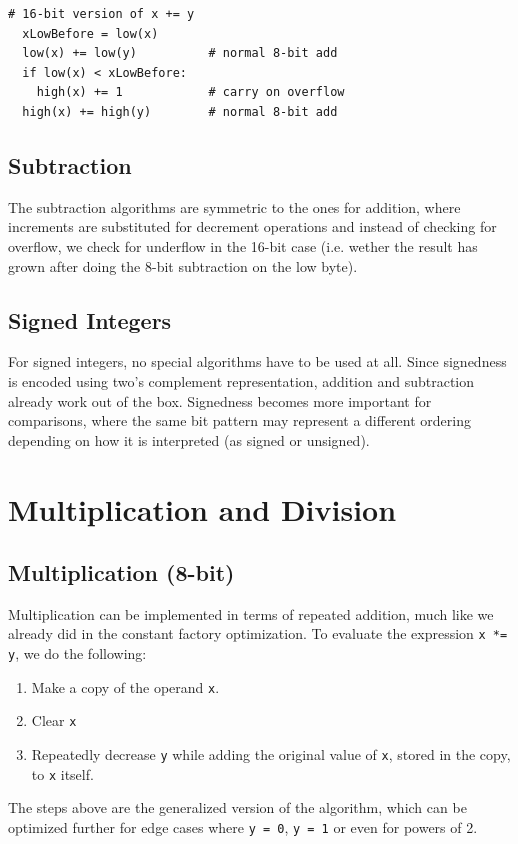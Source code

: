 \vspace{0.5cm}\noindent\begin{minipage}{\linewidth}
\begin{lstlisting}[style=pseudocode]
  # 16-bit version of x += y
  xLowBefore = low(x)
  low(x) += low(y)          # normal 8-bit add
  if low(x) < xLowBefore:
    high(x) += 1            # carry on overflow
  high(x) += high(y)        # normal 8-bit add
\end{lstlisting}
\end{minipage}

\subsection{Subtraction}
The subtraction algorithms are symmetric to the ones for addition, where increments are substituted for decrement operations and instead of checking for overflow, we check for underflow in the 16-bit case (i.e. wether the result has grown after doing the 8-bit subtraction on the low byte).

\subsection{Signed Integers}
For signed integers, no special algorithms have to be used at all. Since signedness is encoded using two's complement representation, addition and subtraction already work out of the box. Signedness becomes more important for comparisons, where the same bit pattern may represent a different ordering depending on how it is interpreted (as signed or unsigned).

\section{Multiplication and Division}
\subsection{Multiplication (8-bit)} Multiplication can be implemented in terms of repeated addition, much like we already did in the constant factory optimization. To evaluate the expression \texttt{x *= y}, we do the following:
\begin{enumerate}
\item Make a copy of the operand \texttt{x}.
\item Clear \texttt{x}
\item Repeatedly decrease \texttt{y} while adding the original value of \texttt{x}, stored in the copy, to \texttt{x} itself.
\end{enumerate}
The steps above are the generalized version of the algorithm, which can be optimized further for edge cases where \texttt{y = 0}, \texttt{y = 1} or even for powers of 2.

